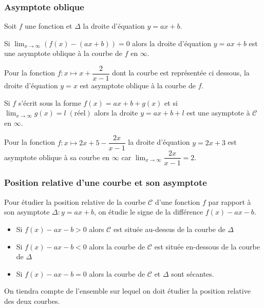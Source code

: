 \subsubsection*{Asymptote oblique}
\begin{definition}
Soit $f$ une fonction et $ \Delta $ la droite d'équation  $y=ax+b$.

Si $\displaystyle \lim_{x \to \infty}\left(f(x)-(ax+b)\right)=0$  alors  la droite  d'équation  $y=ax+b$  est une  asymptote oblique  à la courbe de $f$ en  $\infty$.
\end{definition}

\begin{example}
Pour la fonction $f : x\mapsto x+ \dfrac{2}{x-1} $ dont la courbe est représentée ci dessous,
la droite d'équation   $y = x $ est asymptote oblique à la courbe de $f$.

\end{example}

\begin{remark} 
Si $ f $ s'écrit sous la forme $ f(x)= ax+b + g(x) $ et si $ \displaystyle \lim_{x \to \infty}g(x)=l\; (\text{réel} )$   alors la droite $ y=ax+b+l $ est une asymptote à  $ \mathcal{C} $ en $ \infty. $
\end{remark}
\begin{example}
Pour la fonction $f : x\mapsto 2x+5- \dfrac{2x}{x-1} $ 
la droite d'équation   $y = 2x+3 $ est asymptote oblique à sa courbe en $ \infty$ car  $\displaystyle \lim_{x \to \infty}\dfrac{2x}{x-1}=2$.
\end{example}
\subsubsection*{Position relative d'une courbe et son asymptote}
Pour étudier la position relative de la  courbe $\mathcal{C} $ d'une fonction $ f $ par rapport à son asymptote $ \Delta : y=ax+b $, on étudie le signe de la différence $ f(x)-ax-b$.
\begin{itemize}
\item  Si $ f(x)-ax-b > 0$ alors  $ \mathcal{C}  $ est  située  au-dessus de la courbe de $ \Delta $ 
\item  Si $ f(x)-ax-b< 0$ alors la courbe de $\mathcal{C}$ est  située  en-dessous de la courbe de $\Delta$ 
\item  Si $ f(x)-ax-b= 0$ alors la courbe de $\mathcal{C}$ et  $\Delta$  sont sécantes.
\end{itemize}
On tiendra compte de l'ensemble sur lequel on doit étudier la position relative des deux courbes.
